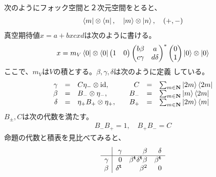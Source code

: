 {\begin{note}[証明のカギ]
\begin{description}
			次のようにフォック空間と２次元空間をとると、
			\begin{equation*}\begin{split}
				\mathinner{\langle{m}|}\otimes\mathinner{\langle{n}|}
				,\quad \mathinner{|{m}\rangle}\otimes\mathinner{|{n}\rangle}
				,\quad (+,-)
			\end{split}\end{equation*}
			真空期待値$x=a+bxcxd$は次のように書ける。
			\begin{equation*}\begin{split}
				x = m_V\mathinner{\langle{0}|}\otimes\mathinner{\langle{0}|}\begin{pmatrix}
					1 & 0
				\end{pmatrix}\begin{pmatrix}
					b\beta & a \\
					c\gamma & d\delta
				\end{pmatrix}^*\begin{pmatrix}
					0 \\ 1
				\end{pmatrix}\mathinner{|{0}\rangle}\otimes\mathinner{|{0}\rangle} \\
			\end{split}\end{equation*}
			ここで、$m_V$は$V$の積とする。$\beta,\gamma,\delta$は次のように定義
			している。
			\begin{equation*}\begin{array}{rclrcl}
				\gamma &=& C\eta_-\otimes{\ensuremath{\operatorname{id}}},
					&\quad C &=& \sum_{m\in\mathbf{N}}\mathinner{|{2m}\rangle}\mathinner{\langle{2m}|} \\
				\beta &=& B_-\otimes\eta_-,
					&\quad B_- &=& \sum_{m\in\mathbf{N}}\mathinner{|{m}\rangle}\mathinner{\langle{2m}|} \\
				\delta &=& \eta_+B_+\otimes\eta_+,
					&\quad B_+ &=& \sum_{m\in\mathbf{N}}\mathinner{|{2m}\rangle}\mathinner{\langle{m}|} \\
			\end{array}\end{equation*}
			$B_\pm,C$は次の代数を満たす。
			\begin{equation*}\begin{split}
				B_-B_+ = 1,\quad B_+B_- = C
			\end{split}\end{equation*}
			命題の代数と積表を見比べてみると、
			\begin{equation*}\begin{split}
				\begin{array}{r|rrr}
					& \gamma & \beta & \delta \\\hline
					\gamma & 0 & \beta^{\mathbf{t}}\delta^{\mathbf{t}}\beta & \beta^{\mathbf{t}} \\
					\beta & \delta^{\mathbf{t}} & \beta^2 & 0 \\

\end{array}
\end{split}
\end{equation*}
\end{description}
\end{note}}
